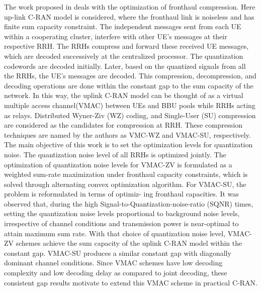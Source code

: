 \begin{multicols}{2}
\begin{itemize}
The work proposed in \cite{art3-key53} deals with the optimization of fronthaul compression. Here up-link C-RAN model is considered, where the fronthaul link is noiseless and has finite sum capacity constraint. The independent messages sent from each UE within a cooperating cluster, interfere with other UE’s messages at their respective RRH. The RRHs compress and forward these received UE messages, which are decoded successively at the centralized processor. The quantization codewords are decoded initially. Later, based on the quantized signals from all the RRHs, the UE’s messages are decoded. This compression, decompression, and decoding operations are done within the constant gap to the sum capacity of the network. In this way, the uplink C-RAN model can be thought of as a virtual multiple access channel(VMAC) between UEs and BBU pools while RRHs acting as relays. Distributed Wyner-Ziv (WZ) coding, and Single-User (SU) compression are considered as the candidates for compression at RRH. These compression techniques are named by the authors as VMC-WZ and VMAC-SU, respectively. The main objective of this work is to set the optimization levels for quantization noise. The quantization noise level of all RRHs is optimized jointly. The optimization of quantization noise levels for VMAC-ZV is formulated as a weighted sum-rate maximization under fronthaul capacity constraints, which is solved through alternating convex optimization algorithm. For VMAC-SU, the problem is reformulated in terms of optimiz- ing fronthaul capacities. It was observed that, during the high Signal-to-Quantization-noise-ratio (SQNR) times, setting the quantization noise levels proportional to background noise levels, irrespective of channel conditions and transmission power is near-optimal to attain maximum sum rate. With that choice of quantization noise level, VMAC-ZV schemes achieve the sum capacity of the uplink C-RAN model within the constant gap. VMAC-SU produces a similar constant gap with diagonally dominant channel conditions. Since VMAC schemes have low decoding complexity and low decoding delay as compared to joint decoding, these consistent gap results motivate to extend this VMAC scheme in practical \break C-RAN.


\end{itemize}
\end{multicols}
